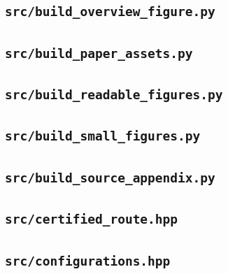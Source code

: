 \subsection*{\texttt{src/build\_overview\_figure.py}}

\subsection*{\texttt{src/build\_paper\_assets.py}}

\subsection*{\texttt{src/build\_readable\_figures.py}}

\subsection*{\texttt{src/build\_small\_figures.py}}

\subsection*{\texttt{src/build\_source\_appendix.py}}

\subsection*{\texttt{src/certified\_route.hpp}}

\subsection*{\texttt{src/configurations.hpp}}

